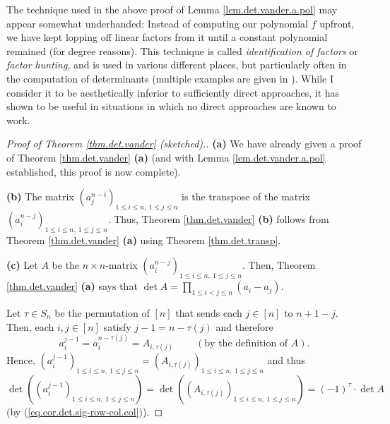 The technique used in the above proof of Lemma \ref{lem.det.vander.a.pol} may
appear somewhat underhanded: Instead of computing our polynomial $f$ upfront,
we have kept lopping off linear factors from it until a constant polynomial
remained (for degree reasons). This technique is called \emph{identification
of factors} or \emph{factor hunting}, and is used in various different places,
but particularly often in the computation of determinants (multiple examples
are given in \cite[\S 2.4 and further below]{Krattenthaler}). While I consider
it to be aesthetically inferior to sufficiently direct approaches, it has
shown to be useful in situations in which no direct approaches are known to work.

\begin{proof}
[Proof of Theorem \ref{thm.det.vander} (sketched).]\textbf{(a)} We have
already given a proof of Theorem \ref{thm.det.vander} \textbf{(a)} (and with
Lemma \ref{lem.det.vander.a.pol} established, this proof is now complete).
\medskip

\textbf{(b)} The matrix $\left(  a_{j}^{n-i}\right)  _{1\leq i\leq n,\ 1\leq
j\leq n}$ is the transpose of the matrix $\left(  a_{i}^{n-j}\right)  _{1\leq
i\leq n,\ 1\leq j\leq n}$. Thus, Theorem \ref{thm.det.vander} \textbf{(b)}
follows from Theorem \ref{thm.det.vander} \textbf{(a)} using Theorem
\ref{thm.det.transp}. \medskip

\textbf{(c)} Let $A$ be the $n\times n$-matrix $\left(  a_{i}^{n-j}\right)
_{1\leq i\leq n,\ 1\leq j\leq n}$. Then, Theorem \ref{thm.det.vander}
\textbf{(a)} says that $\det A=\prod_{1\leq i<j\leq n}\left(  a_{i}%
-a_{j}\right)  $.

Let $\tau\in S_{n}$ be the permutation of $\left[  n\right]  $ that sends each
$j\in\left[  n\right]  $ to $n+1-j$. Then, each $i,j\in\left[  n\right]  $
satisfy $j-1=n-\tau\left(  j\right)  $ and therefore
\[
a_{i}^{j-1}=a_{i}^{n-\tau\left(  j\right)  }=A_{i,\tau\left(  j\right)
}\ \ \ \ \ \ \ \ \ \ \left(  \text{by the definition of }A\right)  .
\]
Hence, $\left(  a_{i}^{j-1}\right)  _{1\leq i\leq n,\ 1\leq j\leq n}=\left(
A_{i,\tau\left(  j\right)  }\right)  _{1\leq i\leq n,\ 1\leq j\leq n}$ and
thus%
\[
\det\left(  \left(  a_{i}^{j-1}\right)  _{1\leq i\leq n,\ 1\leq j\leq
n}\right)  =\det\left(  \left(  A_{i,\tau\left(  j\right)  }\right)  _{1\leq
i\leq n,\ 1\leq j\leq n}\right)  =\left(  -1\right)  ^{\tau}\cdot\det A
\]
(by (\ref{eq.cor.det.sig-row-col.col})).


\end{proof}
